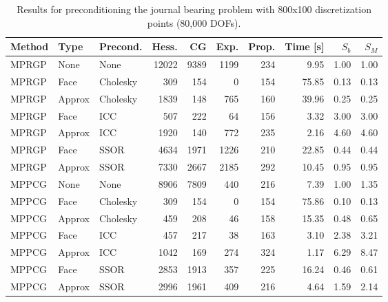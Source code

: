 \documentclass[11pt]{article}
\theoremstyle{plain}
\theoremstyle{definition}
\begin{document}
\begin{table}[htbp]
\centering
\begin{tabular}{l *{2}{|l} *{7}{|r}}
  Method & Type & Precond. & Hess. & CG & Exp. & Prop. & Time [s] & $S_b$ & $S_M$\\\hline
MPRGP & None & None & 12022 & 9389 & 1199 & 234 & 9.95 & 1.00 & 1.00\\ \hline
MPRGP & Face & Cholesky & 309 & 154 & 0 & 154 & 75.85 & 0.13 & 0.13\\
MPRGP & Approx & Cholesky & 1839 & 148 & 765 & 160 & 39.96 & 0.25 & 0.25\\ \hline
MPRGP & Face & ICC & 507 & 222 & 64 & 156 & 3.32 & 3.00 & 3.00\\
MPRGP & Approx & ICC & 1920 & 140 & 772 & 235 & 2.16 & 4.60 & 4.60\\ \hline
MPRGP & Face & SSOR & 4634 & 1971 & 1226 & 210 & 22.85 & 0.44 & 0.44\\
MPRGP & Approx & SSOR & 7330 & 2667 & 2185 & 292 & 10.45 & 0.95 & 0.95\\ \hline \hline
MPPCG & None & None & 8906 & 7809 & 440 & 216 & 7.39 & 1.00 & 1.35\\ \hline
MPPCG & Face & Cholesky & 309 & 154 & 0 & 154 & 75.86 & 0.10 & 0.13\\
MPPCG & Approx & Cholesky & 459 & 208 & 46 & 158 & 15.35 & 0.48 & 0.65\\ \hline
MPPCG & Face & ICC & 457 & 217 & 38 & 163 & 3.10 & 2.38 & 3.21\\
MPPCG & Approx & ICC & 1042 & 169 & 274 & 324 & 1.17 & 6.29 & 8.47\\ \hline
MPPCG & Face & SSOR & 2853 & 1913 & 357 & 225 & 16.24 & 0.46 & 0.61\\
MPPCG & Approx & SSOR & 2996 & 1961 & 409 & 216 & 4.64 & 1.59 & 2.14\\
\end{tabular}
\caption[Preconditioned journal bearing problem III.]{Results for preconditioning the journal bearing problem with 800x100 discretization points (80,000 DOFs).}
\label{tab:precondJb3}
\end{table}
\end{document}

